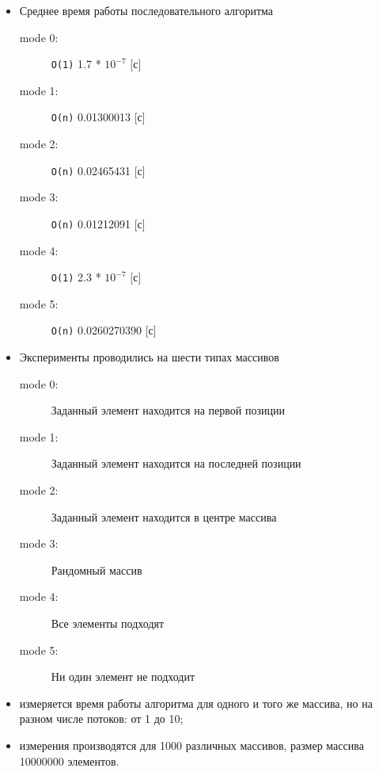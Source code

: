 \begin{itemize}
    \item Среднее время работы последовательного алгоритма

\begin{description}
    \item[mode 0:] \verb|O(1)| 1.7 * $10^{-7}$ [с]
    \item[mode 1:] \verb|O(n)| 0.01300013 [с]
    \item[mode 2:] \verb|O(n)| 0.02465431 [с]
    \item[mode 3:] \verb|O(n)| 0.01212091 [с]
    \item[mode 4:] \verb|O(1)| 2.3 * $10^{-7}$ [с]
    \item[mode 5:] \verb|O(n)| 0.0260270390 [с]
\end{description}
\end{itemize}

\newpage

\raggedbottom {}

\begin{itemize}
    \item Эксперименты проводились на шести типах массивов

\begin{description}
    \item[mode 0:] Заданный элемент находится на первой позиции
    \item[mode 1:] Заданный элемент находится на последней позиции
    \item[mode 2:] Заданный элемент находится в центре массива
    \item[mode 3:] Рандомный массив
    \item[mode 4:] Все элементы подходят
    \item[mode 5:] Ни один элемент не подходит
\end{description}

    \item измеряется время работы алгоритма для одного и того же массива, но на разном числе потоков: от 1 до 10;
    \item измерения производятся для 1\hspace{1mm}000 различных массивов, размер массива 10\hspace{1mm}000\hspace{1mm}000 элементов.
\end{itemize}


